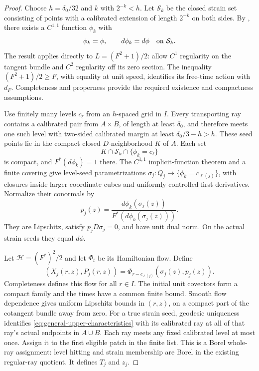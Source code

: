 \documentclass[11pt,reqno]{amsart}
\theoremstyle{definition}
\theoremstyle{remark}
\numberwithin{equation}{section}
\begin{document}
\begin{proof}
Choose \(h=\delta_0/32\) and \(k\) with \(2^{-k}<h\). Let
\(\mathcal S_k\) be the closed strain set consisting of points with a
calibrated extension of length \(2^{-k}\) on both sides.
By \cite[Lemma~4.10 and Theorem~4.11]{Assouline}, there exists a
\(C^{1,1}\) function \(\phi_k\) with
\[
 \phi_k=\phi,\qquad d\phi_k=d\phi\quad\hbox{on }\mathcal S_k.
\]
The result applies directly to \(L=(F^2+1)/2\):
\cite[Definition~2.1 and Example~2.6]{Assouline} allow \(C^1\)
regularity on the tangent bundle and \(C^2\) regularity off its zero
section. The inequality \((F^2+1)/2\ge F\), with equality at unit
speed, identifies its free-time action with \(d_F\). Completeness and
properness provide the required existence and compactness assumptions.

Use finitely many levels \(c_\ell\) from an \(h\)-spaced grid in
\(I\). Every transporting ray contains a calibrated pair from
\(A\times B\), of length at least \(\delta_0\), and therefore meets
one such level with two-sided calibrated margin at least
\(\delta_0/3-h>h\). These seed points lie in the compact closed
\(D\)-neighborhood \(K\) of \(A\). Each set
\[
 K\cap\mathcal S_k\cap\{\phi_k=c_\ell\}
\]
is compact, and \(F^*(d\phi_k)=1\) there. The \(C^{1,1}\)
implicit-function theorem and a finite covering give level-seed
parametrizations
\(\sigma_j:Q_j\to\{\phi_k=c_{\ell(j)}\}\), with closures inside
larger coordinate cubes and uniformly controlled first derivatives.
Normalize their conormals by
\[
 p_j(z)=\frac{d\phi_k(\sigma_j(z))}
              {F^*(d\phi_k(\sigma_j(z)))}.
\]
They are Lipschitz, satisfy \(p_jD\sigma_j=0\), and have unit dual
norm. On the actual strain seeds they equal \(d\phi\).

Let \(\mathcal H=(F^*)^2/2\) and let \(\Phi_t\) be its Hamiltonian
flow. Define
\begin{equation}
\label{eq:general-upper-characteristics}
 (X_j(r,z),P_j(r,z))
 =\Phi_{r-c_{\ell(j)}}(\sigma_j(z),p_j(z)).
\end{equation}
Completeness defines this flow for all \(r\in I\). The initial unit
covectors form a compact family and the times have a common finite
bound. Smooth flow dependence gives uniform Lipschitz bounds in
\((r,z)\), on a compact part of the cotangent bundle away from zero.
For a true strain seed, geodesic uniqueness identifies
\eqref{eq:general-upper-characteristics} with its calibrated ray at
all of that ray's actual endpoints in \(A\cup B\).
Each ray meets any fixed calibrated level at most once. Assign it to
the first eligible patch in the finite list. This is a Borel whole-ray
assignment: level hitting and strain membership are Borel in the
existing regular-ray quotient. It defines \(T_j\) and \(z_j\).


\end{proof}
\end{document}
